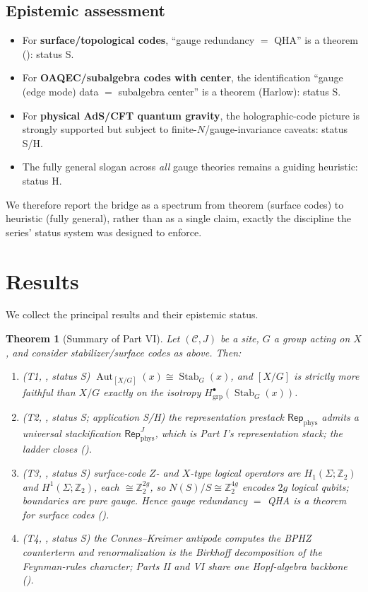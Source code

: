 \documentclass[12pt]{article}
\newtheorem{theorem}{Theorem}[section]
\theoremstyle{definition}
\theoremstyle{remark}
\newcommand{\cat}[1]{\mathcal{#1}}
\newcommand{\Repp}{\mathsf{Rep}_{\mathrm{phys}}}
\newcommand{\Aut}{\operatorname{Aut}}
\newcommand{\Stab}{\operatorname{Stab}}
\newcommand{\quot}[2]{[#1/#2]}
\newcommand{\ZZ}{\mathbb{Z}}
\newcommand{\Ss}{\textsf{S}}
\newcommand{\Hh}{\textsf{H}}
\begin{document}
\subsection{Epistemic assessment}

\begin{itemize}
\item For \textbf{surface/topological codes}, ``gauge redundancy $=$ QHA'' is a theorem
(): status \Ss.
\item For \textbf{OAQEC/subalgebra codes with center}, the identification ``gauge (edge
mode) data $=$ subalgebra center'' is a theorem (Harlow): status \Ss.
\item For \textbf{physical AdS/CFT quantum gravity}, the holographic-code picture is
strongly supported but subject to finite-$N$/gauge-invariance caveats: status \Ss/\Hh.
\item The fully general slogan across \emph{all} gauge theories remains a guiding
heuristic: status \Hh.
\end{itemize}
We therefore report the bridge as a spectrum from theorem (surface codes) to heuristic
(fully general), rather than as a single claim, exactly the discipline the series'
status system was designed to enforce.

\section{Results}
\label{sec:results}

We collect the principal results and their epistemic status.

\begin{theorem}[Summary of Part VI]
\label{thm:summary}
Let $(\cat C, J)$ be a site, $G$ a group acting on $X$, and consider stabilizer/surface
codes as above. Then:
\begin{enumerate}
\item \textup{(T1, , status \Ss)}
$\Aut_{\quot{X}{G}}(x)\cong\Stab_G(x)$, and $\quot{X}{G}$ is strictly more faithful than
$X/G$ exactly on the isotropy $H^\bullet_{\mathrm{grp}}(\Stab_G(x))$.
\item \textup{(T2, , status \Ss; application \Ss/\Hh)} the
representation prestack $\Repp$ admits a universal stackification $\Repp^{J}$, which is
Part I's representation stack; the ladder closes ().
\item \textup{(T3, , status \Ss)} surface-code $Z$- and $X$-type
logical operators are $H_1(\Sigma;\ZZ_2)$ and $H^1(\Sigma;\ZZ_2)$, each $\cong\ZZ_2^{2g}$,
so $N(S)/S\cong\ZZ_2^{4g}$ encodes $2g$ logical qubits; boundaries are pure gauge. Hence
gauge redundancy $=$ QHA is a theorem for surface codes ().
\item \textup{(T4, , status \Ss)} the Connes--Kreimer antipode
computes the BPHZ counterterm and renormalization is the Birkhoff decomposition of the
Feynman-rules character; Parts II and VI share one Hopf-algebra backbone
().
\end{enumerate}
\end{theorem}
\end{document}
